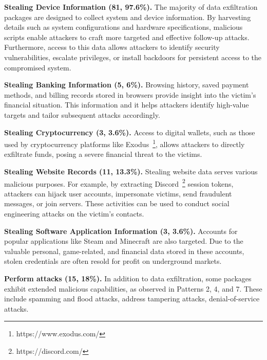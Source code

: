 \textbf{Stealing Device Information (81, 97.6\%).} The majority of data exfiltration packages are designed to collect system and device information.  By harvesting details such as system configurations and hardware specifications, malicious scripts enable attackers to craft more targeted and effective follow-up attacks. Furthermore, access to this data allows attackers to identify security vulnerabilities, escalate privileges, or install backdoors for persistent access to the compromised system.

\textbf{Stealing Banking Information (5, 6\%).} Browsing history, saved payment methods, and billing records stored in browsers provide insight into the victim's financial situation. This information  and it helps attackers identify high-value targets and tailor subsequent attacks accordingly.

\textbf{Stealing Cryptocurrency (3, 3.6\%).} Access to digital wallets, such as those used by cryptocurrency platforms like Exodus~\footnote{https://www.exodus.com/}, allows attackers to directly exfiltrate funds, posing a severe financial threat to the victims. 

\textbf{Stealing Website Records (11, 13.3\%).} Stealing website data serves various malicious purposes. For example, by extracting Discord~\footnote{https://discord.com/} session tokens, attackers can hijack user accounts, impersonate victims, send fraudulent messages, or join servers. These activities can be used to conduct social engineering attacks on the victim's contacts. 

\textbf{Stealing Software Application Information (3, 3.6\%).} Accounts for popular applications like Steam and Minecraft are also targeted. Due to the valuable personal, game-related, and financial data stored in these accounts, stolen credentials are often resold for profit on underground markets. 

\textbf{Perform attacks (15, 18\%).} In addition to data exfiltration, some packages exhibit extended malicious capabilities, as observed in Patterns 2, 4, and 7. These include spamming and flood attacks, address tampering attacks, denial-of-service attacks.


